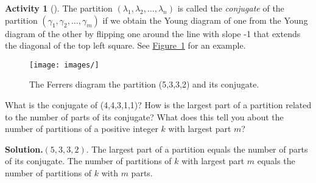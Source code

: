 \documentclass[10pt,]{book}
\theoremstyle{plain}
\theoremstyle{definition}
\newtheorem{activity}[project]{Activity}
\numberwithin{equation}{chapter}
\begin{document}
\begin{activity}[]\label{activity-53}
The partition \((\lambda_1,\lambda_2,\ldots, \lambda_n)\) is called the \emph{conjugate} of the partition \((\gamma_1,\gamma_2,\ldots, \gamma_m)\) if we obtain the Young diagram of one from the Young diagram of the other by flipping one around the line with slope -1 that extends the diagonal of the top left square. See \hyperref[conjugateYoung]{Figure~\ref{conjugateYoung}} for an example.%
\begin{figure}
\centering
\texttt{[image: images/]}
\caption{The Ferrers diagram the partition (5,3,3,2) and its conjugate.\label{conjugateYoung}}
\end{figure}
What is the conjugate of (4,4,3,1,1)? How is the largest part of a partition related to the number of parts of its conjugate? What does this tell you about the number of partitions of a positive integer \(k\) with largest part \(m\)?%
\par\medskip\noindent%
\textbf{Solution.}\quad \((5,3,3,2)\). The largest part of a partition equals the number of parts of its conjugate. The number of partitions of \(k\) with largest part \(m\) equals the number of partitions of \(k\) with \(m\) parts.%
\end{activity}
\end{document}
